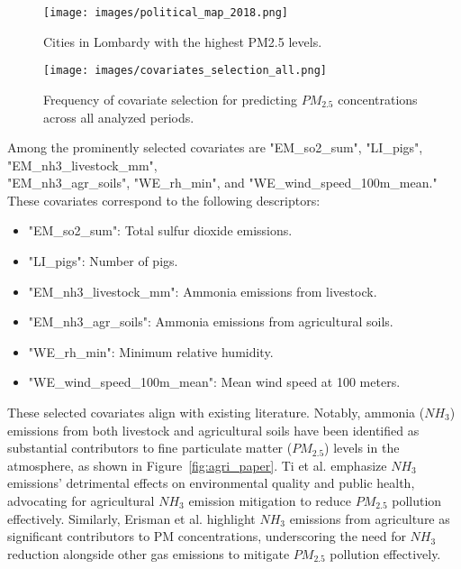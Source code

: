 \documentclass[11pt,a4paper]{article}
\begin{document}
\begin{figure} [H]
    \begin{minipage}{0.48\textwidth}
        \centering
        \texttt{[image: images/political\_map\_2018.png]}
        \captionsetup{format=hang}
        \caption{Cities in Lombardy with the highest PM2.5 levels.}
        \label{fig:polluted_cities}
    \end{minipage}%
    \hfill
    \begin{minipage}{0.48\textwidth}
        \centering
        \texttt{[image: images/covariates\_selection\_all.png]}
        \captionsetup{format=hang}
        \caption{Frequency of covariate selection for predicting $PM_{\text{2.5}}$ concentrations across all analyzed periods.}
        \label{fig:covariate_selection_all}
    \end{minipage}
\end{figure}

Among the prominently selected covariates are "EM\_so2\_sum", "LI\_pigs", "EM\_nh3\_livestock\_mm", \\ "EM\_nh3\_agr\_soils", "WE\_rh\_min", and "WE\_wind\_speed\_100m\_mean." These covariates correspond to the following descriptors:

\begin{itemize}
    \item "EM\_so2\_sum": Total sulfur dioxide emissions.
    \item "LI\_pigs": Number of pigs.
    \item "EM\_nh3\_livestock\_mm": Ammonia emissions from livestock.
    \item "EM\_nh3\_agr\_soils": Ammonia emissions from agricultural soils.
    \item "WE\_rh\_min": Minimum relative humidity.
    \item "WE\_wind\_speed\_100m\_mean": Mean wind speed at 100 meters.
\end{itemize}

These selected covariates align with existing literature. Notably, ammonia ($NH_{3}$) emissions from both livestock and agricultural soils have been identified as substantial contributors to fine particulate matter ($PM_{2.5}$) levels in the atmosphere, as shown in Figure~\ref{fig:agri_paper}. Ti et al. \cite{TI2022131507} emphasize $NH_{3}$ emissions' detrimental effects on environmental quality and public health, advocating for agricultural $NH_{3}$ emission mitigation to reduce $PM_{2.5}$ pollution effectively. Similarly, Erisman et al. \cite{ERISMAN20083209} highlight $NH_{3}$ emissions from agriculture as significant contributors to PM concentrations, underscoring the need for $NH_{3}$ reduction alongside other gas emissions to mitigate $PM_{2.5}$ pollution effectively.
\end{document}
